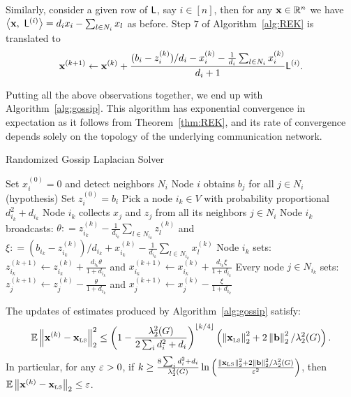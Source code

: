 Similarly, consider a given row of ${\mathsf{L} }$, say $i\in{[n]}$, then for any $\mathbf{x}\in\mathbb{R}^n$ we have
$\left\langle {\mathbf{x}},\ {{\mathsf{L} }^{(i)}} \right\rangle = d_i x_i - \sum_{l\in N_i} x_{l} $ as before. Step $7$ of Algorithm~\ref{alg:REK} is translated to
%
\[ \mathbf{x}^{(k+1)} \leftarrow \mathbf{x}^{(k)} + \frac{(b_{i}  - z_i^{(k)})/d_i -  x_i^{(k)} - \frac1{d_i}\sum_{l\in N_i} x_{i}^{(k)}}{d_i + 1} {\mathsf{L} }^{(i)}.\]
%
%

%
Putting all the above observations together, we end up with Algorithm~\ref{alg:gossip}. This algorithm has exponential convergence in expectation as it follows from Theorem~\ref{thm:REK}, and its rate of convergence depends solely on the topology of the underlying communication network.
%
%
\begin{algorithm}{}
	\caption{Randomized Gossip Laplacian Solver}\label{alg:gossip}%
\begin{algorithmic}[1]
\Procedure{}{}
	\State Set $x^{(0)}_i = 0$ and detect neighbors $N_i$
	\State Node $i$ obtains $b_{j}$ for all $j\in N_i$ (hypothesis)
	\State Set $z^{(0)}_i = b_i$
\EndFor
{}
	\State\label{rek:sampl} Pick a node $i_k\in V$ with probability proportional $d_{i_k}^2 + d_{i_k}$
	\State Node $i_k$ collects $x_{j}$ and $z_{j}$ from all its neighbors $j\in N_i$
	\State Node $i_k$ broadcasts: $\theta : =  z_{i_k}^{(k)} - \frac1{d_{i_k}}\sum_{l\in N_{i_k}} z_l^{(k)}$ and $\xi : =   (b_{i_k} - z_{i_k}^{(k)})/d_{i_k} + x_{i_k}^{(k)} - \frac1{d_{i_k}}\sum_{l\in N_{i_k}} x_l^{(k)}$
	\State Node $i_k$ sets: $z^{(k+1)}_{i_k} \leftarrow  z^{(k)}_{i_k} + \frac{d_{i_k} \theta}{1  + d_{i_k} } $ and $x^{(k+1)}_{i_k} \leftarrow  x^{(k)}_{i_k} + \frac{d_{i_k} \xi }{1  + d_{i_k} } $
	\State Every node $j\in N_{i_k}$ sets: $ z^{(k+1)}_{j} \leftarrow z^{(k)}_{j} - \frac{\theta }{ 1 + d_{i_k} } $ and $ x^{(k+1)}_{j} \leftarrow x^{(k)}_{j} - \frac{\xi}{ 1 + d_{i_k} } $
\EndFor
\EndProcedure
\end{algorithmic}
\end{algorithm}
%
%
\begin{corollary}\label{cor:gossip}
The updates of estimates produced by Algorithm~\ref{alg:gossip} satisfy:
%
\[ \operatorname{\mathbb{E}} {\left\|\mathbf{x}^{(k)} - \mathbf{x}_{\textrm{\tiny LS}}\right\|_2^2} \leq \left(1 - \frac{\lambda_2^2(G)}{2\sum_{i}d_i^2 + d_i}\right)^{\lfloor k/4 \rfloor } \left(\left\|\mathbf{x}_{\textrm{\tiny LS}}\right\|_2^2 + 2\left\|{\mathbf b}\right\|_2^2 / \lambda_2^2(G) \right).\]
%
In particular, for any $\varepsilon>0$, if $k\geq  \frac{8 \sum_{i}d_i^2 + d_i}{\lambda_2^2(G)} \ln\left( \frac{\left\|\mathbf{x}_{\textrm{\tiny LS}}\right\|_2^2 + 2 \left\|{\mathbf b}\right\|_2^2 / \lambda_2^2(G)}{\varepsilon^2}\right)$, then $\operatorname{\mathbb{E}} {\left\|\mathbf{x}^{(k)} - \mathbf{x}_{\textrm{\tiny LS}}\right\|_2} \leq \varepsilon$.
\end{corollary}
